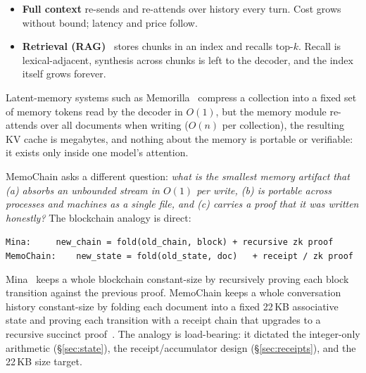 \documentclass[11pt]{article}
\newcommand{\method}{MemoChain}
\begin{document}
\begin{itemize}
\item \textbf{Full context} re-sends and re-attends over history every
turn. Cost grows without bound; latency and price follow.
\item \textbf{Retrieval (RAG)}~\cite{lewis2020rag} stores chunks in an
index and recalls top-$k$. Recall is lexical-adjacent, synthesis across
chunks is left to the decoder, and the index itself grows forever.
\end{itemize}

Latent-memory systems such as
Memorilla~\cite{memorilla2026} compress a collection into a fixed set of
memory tokens read by the decoder in $O(1)$, but the memory module
re-attends over all documents when writing ($O(n)$ per collection), the
resulting KV cache is megabytes, and nothing about the memory is
portable or verifiable: it exists only inside one model's attention.

\method{} asks a different question: \emph{what is the smallest memory
artifact that (a) absorbs an unbounded stream in $O(1)$ per write,
(b) is portable across processes and machines as a single file, and
(c) carries a proof that it was written honestly?} The blockchain
analogy is direct:
\begin{center}
\texttt{Mina:~~~~~new\_chain = fold(old\_chain, block) + recursive zk proof}\\
\texttt{\method{}:~~~~new\_state = fold(old\_state, doc)~~~+ receipt / zk proof}
\end{center}
Mina~\cite{mina2020} keeps a whole blockchain constant-size by
recursively proving each block transition against the previous proof.
\method{} keeps a whole conversation history constant-size by folding
each document into a fixed 22\,KB associative state and proving each
transition with a receipt chain that upgrades to a recursive succinct
proof~\cite{sp1}. The analogy is load-bearing: it dictated the
integer-only arithmetic (\S\ref{sec:state}), the receipt/accumulator
design (\S\ref{sec:receipts}), and the 22\,KB size target.
\end{document}
